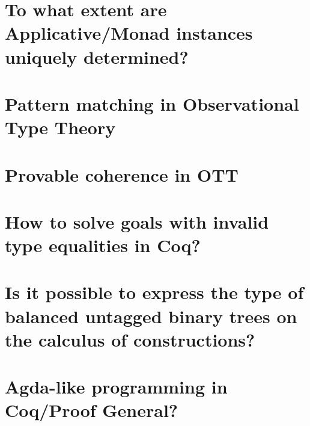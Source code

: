 \documentclass{book}%
\begin{document}
\section{To what extent are Applicative/Monad instances uniquely determined?}


\section{Pattern matching in Observational Type Theory}


\section{Provable coherence in OTT}


\section{How to solve goals with invalid type equalities in Coq?}


\section{Is it possible to express the type of balanced untagged binary trees on the calculus of constructions?}


\section{Agda-like programming in Coq/Proof General?}

\end{document}
